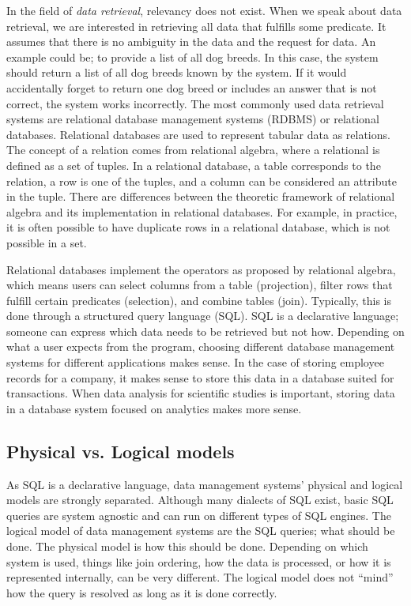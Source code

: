 In the field of \emph{data retrieval}, relevancy does not exist. When we speak about data retrieval, we are interested in retrieving all data that fulfills some predicate. It assumes that there is no ambiguity in the data and the request for data. An example could be; to provide a list of all dog breeds. In this case, the system should return a list of all dog breeds known by the system. If it would accidentally forget to return one dog breed or includes an answer that is not correct, the system works incorrectly. 
The most commonly used data retrieval systems are relational database management systems (RDBMS) or relational databases. Relational databases are used to represent tabular data as relations. The concept of a relation comes from relational algebra, where a relational is defined as a set of tuples. In a relational database, a table corresponds to the relation, a row is one of the tuples, and a column can be considered an attribute in the tuple. There are differences between the theoretic framework of relational algebra and its implementation in relational databases. For example, in practice, it is often possible to have duplicate rows in a relational database, which is not possible in a set. 

Relational databases implement the operators as proposed by relational algebra, which means users can select columns from a table (projection), filter rows that fulfill certain predicates (selection), and combine tables (join). Typically, this is done through a structured query language (SQL).  
SQL is a declarative language; someone can express which data needs to be retrieved but not how. Depending on what a user expects from the program, choosing different database management systems for different applications makes sense. In the case of storing employee records for a company, it makes sense to store this data in a database suited for transactions. When data analysis for scientific studies is important, storing data in a database system focused on analytics makes more sense.

\subsection{Physical vs. Logical models}
As SQL is a declarative language, data management systems' physical and logical models are strongly separated. Although many dialects of SQL exist, basic SQL queries are system agnostic and can run on different types of SQL engines. The logical model of data management systems are the SQL queries; what should be done. The physical model is how this should be done. Depending on which system is used, things like join ordering, how the data is processed, or how it is represented internally, can be very different. The logical model does not ``mind'' how the query is resolved as long as it is done correctly. 

